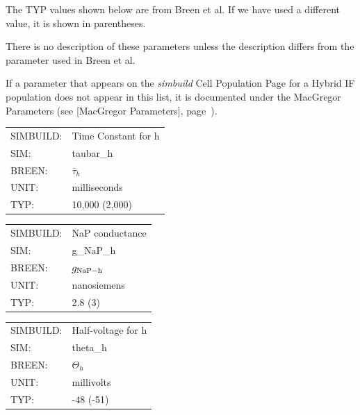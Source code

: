 \documentclass[12pt,openany,oneside]{book}
\newcommand{\tipxref}[1]{see [#1], page~\pageref{#1}}
\newcommand{\prog}[1]{\textit{{#1}}}
\begin{document}
\noindent The TYP values shown below are from Breen et al. If we have
used a different value, it is shown in parentheses.

There is no description of these parameters unless the description
differs from the parameter used in Breen et al.

If a parameter that appears on the \prog{simbuild} Cell Population 
Page for a Hybrid IF population does not appear in this list, it is
documented under the MacGregor Parameters (\tipxref{MacGregor Parameters}).

\begin{flushleft}
\begin{tabular}{@{}ll@{}}
SIMBUILD: & Time Constant for h\\
SIM: & taubar\_h\\
BREEN: & $\bar\tau_h$\\
UNIT: & milliseconds\\
TYP: & 10,000 (2,000)\\
\end{tabular}
\end{flushleft}
\filbreak
\vspace{\baselineskip}

\begin{flushleft}
\begin{tabular}{@{}ll@{}}
SIMBUILD: & NaP conductance\\
SIM: & g\_NaP\_h\\
BREEN: & $g_{\rm NaP-h}$\\
UNIT: & nanosiemens\\
TYP: & 2.8 (3)\\
\end{tabular}
\end{flushleft}
\filbreak
\vspace{\baselineskip}

\begin{flushleft}
\begin{tabular}{@{}ll@{}}
SIMBUILD: & Half-voltage for h\\
SIM: & theta\_h\\
BREEN: & $\Theta_h$\\
UNIT: & millivolts\\
TYP: & -48 (-51)\\
\end{tabular}
\end{flushleft}
\filbreak
\vspace{\baselineskip}
\end{document}
